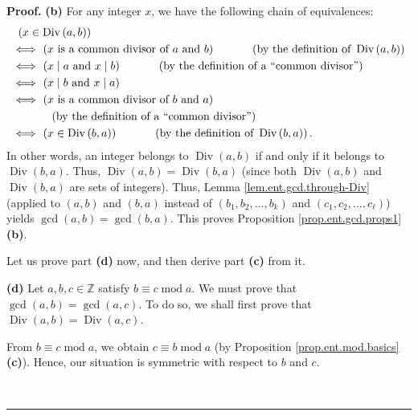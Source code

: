 \documentclass[numbers=enddot,12pt,final,onecolumn,notitlepage]{scrartcl}%
\numberwithin{exer}{subsection}
\theoremstyle{definition}
\newenvironment{proof}[1][Proof]{\noindent\textbf{#1.} }{\ \rule{0.5em}{0.5em}}
\begin{document}
\begin{proof}
\textbf{(b)} For any integer $x$, we have the following chain of equivalences:%
\begin{align*}
&  \ \left(  x\in\operatorname*{Div}\left(  a,b\right)  \right) \\
&  \Longleftrightarrow\ \left(  x\text{ is a common divisor of }a\text{ and
}b\right)  \ \ \ \ \ \ \ \ \ \ \left(  \text{by the definition of
}\operatorname*{Div}\left(  a,b\right)  \right) \\
&  \Longleftrightarrow\ \left(  x\mid a\text{ and }x\mid b\right)
\ \ \ \ \ \ \ \ \ \ \left(  \text{by the definition of a \textquotedblleft
common divisor\textquotedblright}\right) \\
&  \Longleftrightarrow\ \left(  x\mid b\text{ and }x\mid a\right) \\
&  \Longleftrightarrow\ \left(  x\text{ is a common divisor of }b\text{ and
}a\right) \\
&  \ \ \ \ \ \ \ \ \ \ \left(  \text{by the definition of a \textquotedblleft
common divisor\textquotedblright}\right) \\
&  \Longleftrightarrow\ \left(  x\in\operatorname*{Div}\left(  b,a\right)
\right)  \ \ \ \ \ \ \ \ \ \ \left(  \text{by the definition of }%
\operatorname*{Div}\left(  b,a\right)  \right)  .
\end{align*}
In other words, an integer belongs to $\operatorname*{Div}\left(  a,b\right)
$ if and only if it belongs to $\operatorname*{Div}\left(  b,a\right)  $.
Thus, $\operatorname*{Div}\left(  a,b\right)  =\operatorname*{Div}\left(
b,a\right)  $ (since both $\operatorname*{Div}\left(  a,b\right)  $ and
$\operatorname*{Div}\left(  b,a\right)  $ are sets of integers). Thus, Lemma
\ref{lem.ent.gcd.through-Div} (applied to $\left(  a,b\right)  $ and $\left(
b,a\right)  $ instead of $\left(  b_{1},b_{2},\ldots,b_{k}\right)  $ and
$\left(  c_{1},c_{2},\ldots,c_{\ell}\right)  $) yields $\gcd\left(
a,b\right)  =\gcd\left(  b,a\right)  $. This proves Proposition
\ref{prop.ent.gcd.props1} \textbf{(b)}.

Let us prove part \textbf{(d)} now, and then derive part \textbf{(c)} from it.

\textbf{(d)} Let $a,b,c\in\mathbb{Z}$ satisfy $b\equiv c\operatorname{mod}a$.
We must prove that $\gcd\left(  a,b\right)  =\gcd\left(  a,c\right)  $. To do
so, we shall first prove that $\operatorname*{Div}\left(  a,b\right)
=\operatorname*{Div}\left(  a,c\right)  $.

From $b\equiv c\operatorname{mod}a$, we obtain $c\equiv b\operatorname{mod}a$
(by Proposition \ref{prop.ent.mod.basics} \textbf{(c)}). Hence, our situation
is symmetric with respect to $b$ and $c$.


\end{proof}
\end{document}
